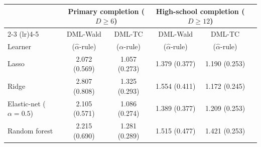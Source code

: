\begin{tabular}{lccccc}
\toprule
& \multicolumn{2}{c}{Primary completion ($D \ge 6$)} & \multicolumn{2}{c}{High-school completion ($D \ge 12$)} & \\
\cmidrule(lr){2-3} \cmidrule(lr){4-5}
 & DML-Wald & DML-TC & DML-Wald & DML-TC & \\
Learner & ($\hat\alpha$-rule) & ($\hat\alpha$-rule) & ($\hat\alpha$-rule) & ($\hat\alpha$-rule) & \\
\midrule
Lasso & 2.072 (0.569) & 1.057 (0.273) & 1.379 (0.377) & 1.190 (0.253) & \\
Ridge & 2.807 (0.808) & 1.325 (0.293) & 1.554 (0.411) & 1.172 (0.245) & \\
Elastic-net ($\alpha = 0.5$) & 2.105 (0.571) & 1.086 (0.274) & 1.389 (0.377) & 1.209 (0.253) & \\
Random forest & 2.215 (0.690) & 1.281 (0.289) & 1.515 (0.477) & 1.421 (0.253) & \\
\bottomrule
\end{tabular}
